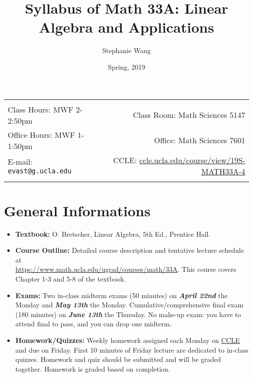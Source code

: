 \documentclass[11pt]{article}
\title{Syllabus of Math 33A: Linear Algebra and Applications}
\author{Stephanie Wang}
\date{Spring, 2019}
\begin{document}
\maketitle

\begin{tabular*}{.93\textwidth}{@{\extracolsep{\fill}}lr}


\hline
 & \\
 Class Hours: MWF 2-2:50pm & Class Room: Math Sciences 5147 \\
 Office Hours: MWF 1-1:50pm  &  Office: Math Sciences 7601 \\
 E-mail: \texttt{evast@g.ucla.edu} & CCLE: \href{https://ccle.ucla.edu/course/view/19S-MATH33A-4}{ccle.ucla.edu/course/view/19S-MATH33A-4}\\ 
 & \\
\hline
\end{tabular*}

\vspace{5 mm}


\section*{General Informations}
\begin{itemize}
  \item {\bf Textbook:} O. Bretscher, Linear Algebra, 5th Ed., Prentice Hall.
  \item {\bf Course Outline:} Detailed course description and tentative lecture schedule at \\ \href{https://www.math.ucla.edu/ugrad/courses/math/33A}{https://www.math.ucla.edu/ugrad/courses/math/33A}. This course covers Chapter 1-3 and 5-8 of the textbook.
  \item {\bf Exams:} Two in-class midterm exams (50 minutes) on \textbf{\textit{April 22nd}} the Monday and \textbf{\textit{May 13th}} the Monday. Cumulative/comprehensive final exam (180 minutes) on \textbf{\textit{June 13th}} the Thursday. No make-up exam: you have to attend final to pass, and you can drop one midterm.
  \item {\bf Homework/Quizzes:} Weekly homework assigned each Monday on \href{https://ccle.ucla.edu/course/view/19S-MATH33A-4}{CCLE} and due on Friday. First 10 minutes of Friday lecture are dedicated to in-class quizzes. Homework and quiz should be submitted and will be graded together. Homework is graded based on completion. 

\end{itemize}
\end{document}
